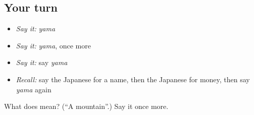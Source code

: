 \subsection*{Your turn}
\begin{itemize}
\raggedright
  \item \emph{Say it:} \emph{yama}
  \item \emph{Say it:} \emph{yama}, once more
  \item \emph{Say it:} say \emph{yama}
  \item \emph{Recall:} say the Japanese for a name, then the Japanese for money, then say \emph{yama} again
\end{itemize}

\begin{tcolorbox}[breakable,colback=teal!4,colframe=teal!35!black,title={Before you move on}]
What does  mean? (\textquotedblleft{}A mountain\textquotedblright{}.) Say it once more.
\end{tcolorbox}
